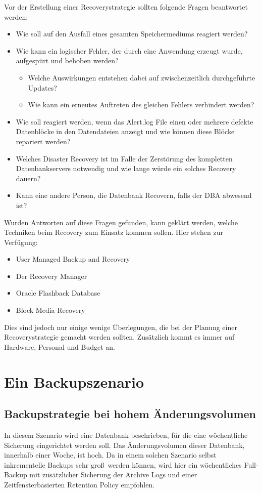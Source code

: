         Vor der Erstellung einer Recoverystrategie sollten folgende Fragen beantwortet werden:
        \begin{itemize}
          \item Wie soll auf den Ausfall eines gesamten Speichermediums reagiert werden?
          \item Wie kann ein logischer Fehler, der durch eine Anwendung erzeugt wurde, aufgespürt und behoben werden?
            \begin{itemize}
              \item Welche Auswirkungen entstehen dabei auf zwischenzeitlich durchgeführte Updates?
              \item Wie kann ein erneutes Auftreten des gleichen Fehlers verhindert werden?
            \end{itemize}
          \item Wie soll reagiert werden, wenn das Alert.log File einen oder mehrere defekte Datenblöcke in den Datendateien anzeigt und wie können diese Blöcke repariert werden?
          \item Welches Disaster Recovery ist im Falle der Zerstörung des kompletten Datenbankservers notwendig und wie lange würde ein solches Recovery dauern?
          \item Kann eine andere Person, die Datenbank Recovern, falls der DBA abwesend ist?
        \end{itemize}
        Wurden Antworten auf diese Fragen gefunden, kann geklärt werden, welche Techniken beim Recovery zum Einsatz kommen sollen. Hier stehen zur Verfügung:
        \begin{itemize}
          \item User Managed Backup and Recovery
          \item Der Recovery Manager
          \item Oracle Flashback Database
          \item Block Media Recovery
        \end{itemize}
        Dies sind jedoch nur einige wenige Überlegungen, die bei der Planung einer Recoverystrategie gemacht werden sollten. Zusätzlich kommt es immer auf Hardware, Personal und Budget an.
    \section{Ein Backupszenario}
      \label{backupszenarios}
      \subsection{Backupstrategie bei hohem Änderungsvolumen}
        In diesem Szenario wird eine Datenbank beschrieben, für die eine wöchentliche Sicherung eingerichtet werden soll. Das Änderungsvolumen dieser Datenbank, innerhalb einer Woche, ist hoch. Da in einem solchen Szenario selbst inkrementelle Backups sehr gro\ss\ werden können, wird hier ein wöchentliches Full-Backup mit zusätzlicher Sicherung der Archive Logs und einer Zeitfensterbasierten Retention Policy empfohlen.

